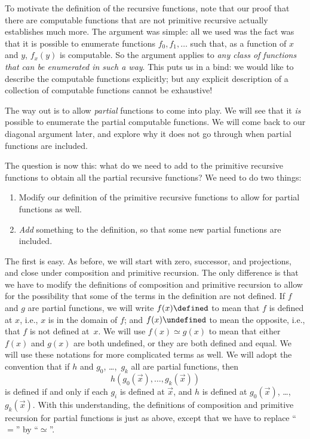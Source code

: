\documentclass[../../include/open-logic-section]{subfiles}
\begin{document}


To motivate the definition of the recursive functions, note that our
proof that there are computable functions that are not primitive
recursive actually establishes much more. The argument was
simple: all we used was the fact was that it is possible to enumerate
functions $f_0,f_1,\dots$ such that, as a function of $x$ and $y$,
$f_x(y)$ is computable. So the argument applies to \emph{any class of
  functions that can be enumerated in such a way}. This puts us in a
bind: we would like to describe the computable functions explicitly;
but any explicit description of a collection of computable functions
cannot be exhaustive!

The way out is to allow \emph{partial} functions to come into play. We
will see that it \emph{is} possible to enumerate the partial
computable functions. We will come back to our diagonal
argument later, and explore why it does not go through when partial
functions are included.

The question is now this: what do we need to add to the primitive
recursive functions to obtain all the partial recursive functions? We
need to do two things:
\begin{enumerate}
\item Modify our definition of the primitive recursive functions to
  allow for partial functions as well.
\item \emph{Add} something to the definition, so that some new partial
  functions are included.
\end{enumerate}

The first is easy. As before, we will start with zero, successor, and
projections, and close under composition and primitive recursion. The
only difference is that we have to modify the definitions of
composition and primitive recursion to allow for the possibility that
some of the terms in the definition are not defined. If $f$ and $g$
are partial functions, we will write $f(x) \defined$ to mean that $f$
is defined at $x$, i.e., $x$ is in the domain of $f$; and $f(x)
\undefined$ to mean the opposite, i.e., that $f$ is not defined at~$x$.
We will use $f(x) \simeq g(x)$ to mean that either $f(x)$ and $g(x)$
are both undefined, or they are both defined and equal. We will use these
notations for more complicated terms as well. We will adopt the
convention that if $h$ and $g_0$, \dots,~$g_k$ all are partial functions,
then
\[
h(g_0(\vec x),\dots,g_k(\vec x))
\]
is defined if and only if each $g_i$ is defined at $\vec x$, and $h$
is defined at $g_0(\vec x)$, \dots,~$g_k(\vec x)$. With this
understanding, the definitions of composition and primitive recursion
for partial functions is just as above, except that we have to replace
``$=$'' by ``$\simeq$''.
\end{document}
